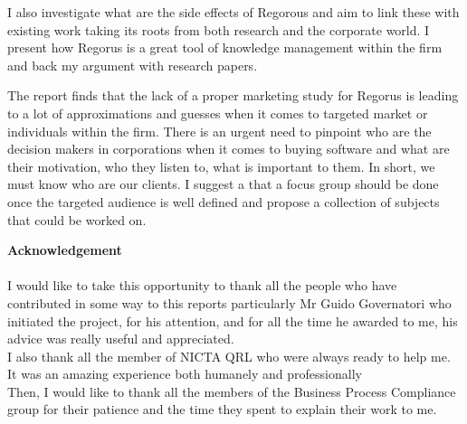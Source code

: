 \documentclass[10pt]{report}
\begin{document}
\begin{center}
\begin{minipage}{\textwidth}
I also investigate what are the side effects of Regorous and aim to link these with existing work taking its roots from both research and the corporate world. I present how Regorus is a great tool of knowledge management within the firm and back my argument with research papers.

The report finds that the lack of a proper marketing study for Regorus is leading to a lot of approximations and guesses when it comes to targeted market or individuals within the firm. There is an urgent need to pinpoint who are the decision makers in corporations when it comes to buying software and what are their motivation, who they listen to, what is important to them. In short, we must know who are our clients. I suggest a that a focus group should be done once the targeted audience is well defined and propose a collection of subjects that could be worked on.

\end{minipage}
\end{center}

\newpage

\begin{center}
\begin{minipage}{.8\textwidth}
\textbf{\large Acknowledgement}\\\\
I would like to take this opportunity to thank all the people who have contributed in some way to this reports particularly Mr Guido Governatori who initiated the project, for his attention, and for all the time he awarded to me, his advice was really useful and appreciated.\\

I also thank all the member of NICTA QRL who were always ready to help me. It was an amazing experience both humanely and professionally \\

Then, I would like to thank all the members of the Business Process Compliance group for their patience and the time they spent to explain their work to me.\\

\end{minipage}
\end{center}

\newpage
\setcounter{tocdepth}{3} %
\tableofcontents
\newpage
{}
\setcounter{page}{1}
\pagestyle{fancy}
\renewcommand{\sectionmark}[1]{\markright{\thesection.\ #1}}
\fancyhead{}
\fancyhead[R]{\slshape \rightmark}
\fancyfoot{}
\fancyfoot[C]{\thepage}
\renewcommand{\headrulewidth}{0.4pt}
\renewcommand{\footrulewidth}{0 pt}
\end{document}
